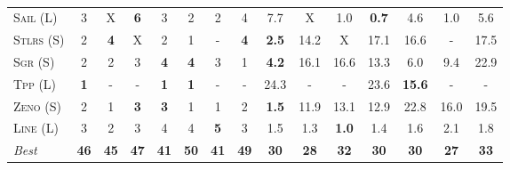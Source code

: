 \documentclass[11pt,landscape]{article}
\begin{document}
\begin{table}[tb]
{\begin{tabular}{|l||ccccccc||ccccccc||}
\textsc{Sail} (L)&3&X&\textbf{6}&3&2&2&4&7.7&X&1.0&\textbf{0.7}&4.6&1.0&5.6\\
\textsc{Stlrs} (S)&2&\textbf{4}&X&2&1&-&\textbf{4}&\textbf{2.5}&14.2&X&17.1&16.6&-&17.5\\
\textsc{Sgr} (S)&2&2&3&\textbf{4}&\textbf{4}&3&1&\textbf{4.2}&16.1&16.6&13.3&6.0&9.4&22.9\\
\textsc{Tpp} (L)&\textbf{1}&-&-&\textbf{1}&\textbf{1}&-&-&24.3&-&-&23.6&\textbf{15.6}&-&-\\
\textsc{Zeno} (S)&2&1&\textbf{3}&\textbf{3}&1&1&2&\textbf{1.5}&11.9&13.1&12.9&22.8&16.0&19.5\\
\textsc{Line} (L)&3&2&3&4&4&\textbf{5}&3&1.5&1.3&\textbf{1.0}&1.4&1.6&2.1&1.8
\\\hline
\textit{Best}&\textbf{46}&\textbf{45}&\textbf{47}&\textbf{41}&\textbf{50}&\textbf{41}&\textbf{49}&\textbf{30}&\textbf{28}&\textbf{32}&\textbf{30}&\textbf{30}&\textbf{27}&\textbf{33}\\\hline

        \end{tabular}}
        \caption{}
        \label{tab:table-5}
        \end{table}
        
\end{document}
